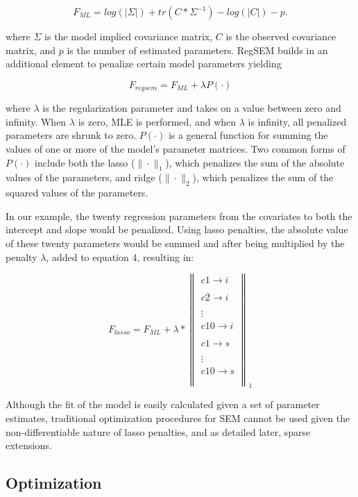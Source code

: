 \documentclass[article]{jss}
\begin{document}
\[\tag{3}
F_{ML}=log(\left|\Sigma\right|)+tr(C*\Sigma^{-1})-log(\left|C\right|)- p.
\]

where \(\Sigma\) is the model implied covariance matrix, \(C\) is the
observed covariance matrix, and \(p\) is the number of estimated
parameters. RegSEM builds in an additional element to penalize certain
model parameters yielding

\[\tag{4}
F_{regsem} = F_{ML} + \lambda P(\cdot)
\]

where \(\lambda\) is the regularization parameter and takes on a value
between zero and infinity. When \(\lambda\) is zero, MLE is performed,
and when \(\lambda\) is infinity, all penalized parameters are shrunk to
zero. \(P(\cdot)\) is a general function for summing the values of one
or more of the model's parameter matrices. Two common forms of
\(P(\cdot)\) include both the lasso (\(\| \cdot \|_{1}\)), which
penalizes the sum of the absolute values of the parameters, and ridge
(\(\| \cdot \|_{2}\)), which penalizes the sum of the squared values of
the parameters.

In our example, the twenty regression parameters from the covariates to
both the intercept and slope would be penalized. Using lasso penalties,
the absolute value of these twenty parameters would be summed and after
being multiplied by the penalty \(\lambda\), added to equation 4,
resulting in:

\[\tag{5}
F_{lasso} = F_{ML} + \lambda * \left\|  \begin{matrix}  
c1 \xrightarrow[]{} i\\
c2\xrightarrow[]{}i\\
\vdots \\
c10\xrightarrow[]{}i\\
c1\xrightarrow[]{}s\\
\vdots \\
c10\xrightarrow[]{}s\\
\end{matrix}  \right\|_{1}
\]

Although the fit of the model is easily calculated given a set of
parameter estimates, traditional optimization procedures for SEM cannot
be used given the non-differentiable nature of lasso penalties, and as
detailed later, sparse extensions.

\subsection{Optimization}\label{optimization}
\end{document}
